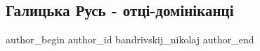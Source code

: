  
 
 
 
 
 
\subsection{Галицька Русь - отці-домініканці}
\label{sec:05_08_2021.fb.bandrivskij_nikolaj.1.galickaja_rus_otcy_dominikancy}
 
\ifcmt
 author_begin
   author_id bandrivskij_nikolaj
 author_end
\fi

